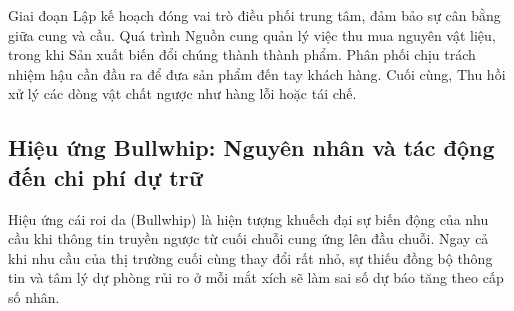 Giai đoạn Lập kế hoạch đóng vai trò điều phối trung tâm, đảm bảo sự cân bằng giữa cung và cầu. Quá trình Nguồn cung quản lý việc thu mua nguyên vật liệu, trong khi Sản xuất biến đổi chúng thành thành phẩm. Phân phối chịu trách nhiệm hậu cần đầu ra để đưa sản phẩm đến tay khách hàng. Cuối cùng, Thu hồi xử lý các dòng vật chất ngược như hàng lỗi hoặc tái chế.

\subsection{Hiệu ứng Bullwhip: Nguyên nhân và tác động đến chi phí dự trữ}
Hiệu ứng cái roi da (Bullwhip) \cite{christopher2016} là hiện tượng khuếch đại sự biến động của nhu cầu khi thông tin truyền ngược từ cuối chuỗi cung ứng lên đầu chuỗi. Ngay cả khi nhu cầu của thị trường cuối cùng thay đổi rất nhỏ, sự thiếu đồng bộ thông tin và tâm lý dự phòng rủi ro ở mỗi mắt xích sẽ làm sai số dự báo tăng theo cấp số nhân.

